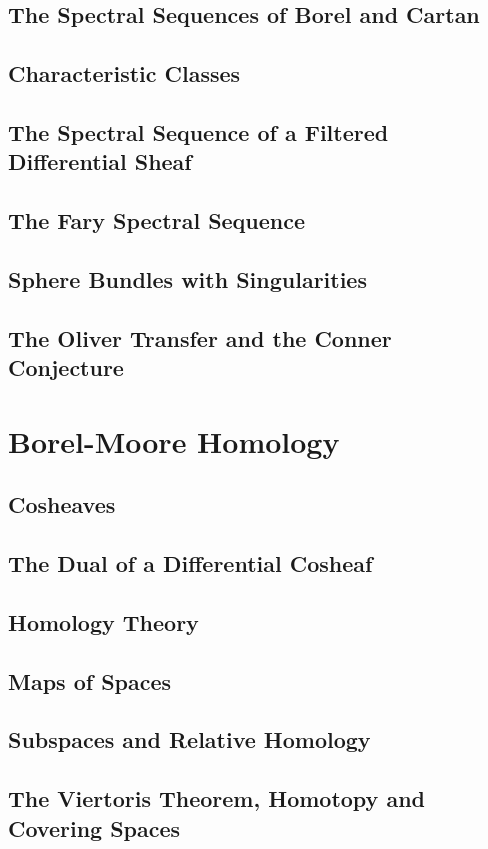 \subsection{The Spectral Sequences of Borel and Cartan}
\subsection{Characteristic Classes}
\subsection{The Spectral Sequence of a Filtered Differential Sheaf}
\subsection{The Fary Spectral Sequence}
\subsection{Sphere Bundles with Singularities}
\subsection{The Oliver Transfer and the Conner Conjecture}

\section{Borel-Moore Homology}
\subsection{Cosheaves}
\subsection{The Dual of a Differential Cosheaf}
\subsection{Homology Theory}
\subsection{Maps of Spaces}
\subsection{Subspaces and Relative Homology}
\subsection{The Viertoris Theorem, Homotopy and Covering Spaces}
